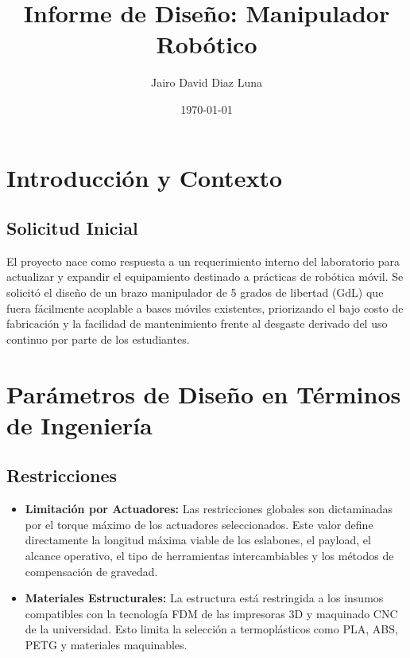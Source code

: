 \documentclass[12pt, a4paper]{article}
\title{\textbf{Informe de Diseño: Manipulador Robótico}}
\author{Jairo David Diaz Luna}
\date{\today}
\begin{document}
\maketitle
\thispagestyle{empty} 
\newpage

\tableofcontents
\newpage


\section{Introducción y Contexto}

\subsection{Solicitud Inicial}
El proyecto nace como respuesta a un requerimiento interno del laboratorio para actualizar y expandir el equipamiento destinado a prácticas de robótica móvil. Se solicitó el diseño de un brazo manipulador de 5 grados de libertad (GdL) que fuera fácilmente acoplable a bases móviles existentes, priorizando el bajo costo de fabricación y la facilidad de mantenimiento frente al desgaste derivado del uso continuo por parte de los estudiantes.

\section{Parámetros de Diseño en Términos de Ingeniería}

\subsection{Restricciones}
\begin{itemize}
    \item \textbf{Limitación por Actuadores:} Las restricciones globales son dictaminadas por el torque máximo de los actuadores seleccionados. Este valor define directamente la longitud máxima viable de los eslabones, el payload, el alcance operativo, el tipo de herramientas intercambiables y los métodos de compensación de gravedad.
    \item \textbf{Materiales Estructurales:} La estructura está restringida a los insumos compatibles con la tecnología FDM de las impresoras 3D y maquinado CNC de la universidad. Esto limita la selección a termoplásticos como PLA, ABS, PETG y materiales maquinables.
\end{itemize}
\end{document}
